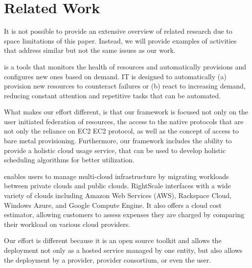 \documentclass{tex/sig-alternate-2013}
\begin{document}
\section{Related Work}\label{S:related}


It is not possible to provide an extensive overview of related research due to space limitations of this paper. Instead, we will provide examples of activities that address similar but not the same issues as our work.

\begin{description}[leftmargin=0pt,itemsep=0pt,topsep=0pt]

\item[Phantom] \cite{phantom12,www-phantom} is a tools that monitors
  the health of resources and automatically provisions and configures
  new ones based on demand. IT is designed to automatically (a)
  provision new resources to counteract failures or (b) react to
  increasing demand, reducing constant attention and repetitive tasks
  that can be automated.  

  What makes our effort different, is that our framework is focused not only on the
  user initiated federation of resources, the access to the native
  protocols that are not only the reliance on EC2 EC2 protocol, as well as the concept of access to
  bare metal provisioning. Furthermore, our framework includes the ability to provide a holistic cloud usage service, that can be used to develop holistic scheduling algorithms for better utilization.

\item[RightScale] \cite{Rightscale} enables users to manage multi-cloud infrastructure by migrating workloads between private clouds and public clouds. RightScale interfaces with a wide variety of clouds including Amazon Web Services (AWS), Rackspace Cloud, Windows Azure, and Google Compute Engine. It also offers a cloud cost estimator, allowing customers to assess expenses they are charged by comparing their workload on various cloud providers.

Our effort is different because it is an open source toolkit and allows the deployment not only as a hosted service managed by one entity, but also allows the deployment by a provider, provider consortium, or even the user. 


\end{description}
\end{document}
